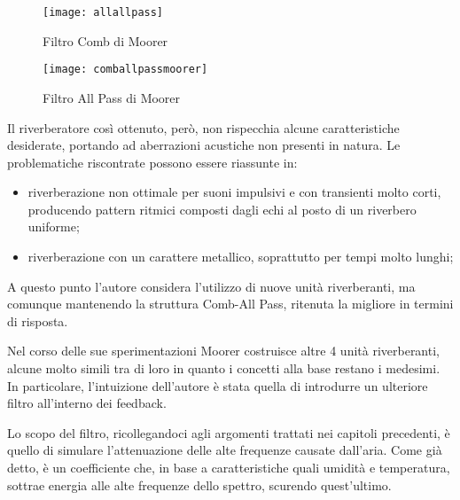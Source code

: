 \begin{figure}[htp]
\centering
\texttt{[image: allallpass]}
\caption{Filtro Comb di Moorer}
\label{fig:allallpass}
\texttt{[image: comballpassmoorer]}
\caption{Filtro All Pass di Moorer}
\label{fig:comballpassmoorerB}
\end{figure}


Il riverberatore così ottenuto, però, non rispecchia alcune caratteristiche
desiderate, portando ad aberrazioni acustiche non presenti in natura.
Le problematiche riscontrate possono essere riassunte in:

\begin{itemize}
\item riverberazione non ottimale per suoni impulsivi e con transienti molto corti, producendo pattern ritmici composti dagli echi al posto di un riverbero uniforme;
\item riverberazione con un carattere metallico, soprattutto per tempi molto lunghi;
\end{itemize}

A questo punto l’autore considera l’utilizzo di nuove unità riverberanti, ma
comunque mantenendo la struttura Comb-All Pass, ritenuta la migliore in termini
di risposta.


Nel corso delle sue sperimentazioni Moorer costruisce altre 4 unità riverberanti,
alcune molto simili tra di loro in quanto i concetti alla base restano i medesimi.
In particolare, l’intuizione dell’autore è stata quella di introdurre un ulteriore
filtro all’interno dei feedback.

Lo scopo del filtro, ricollegandoci agli argomenti trattati nei capitoli
precedenti, è quello di simulare l’attenuazione delle alte frequenze causate
dall’aria. Come già detto, è un coefficiente che, in base a caratteristiche
quali umidità e temperatura, sottrae energia alle alte frequenze dello spettro,
scurendo quest’ultimo.


